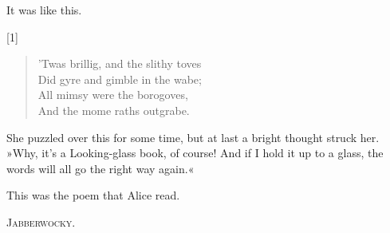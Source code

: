 It was like this.



	\begin{center}\scshape
	\end{center}

\scalebox{-1}[1]{%
\begin{minipage}{\linewidth}
	\raggedleft
	\begin{verse}
	\begin{altverse}
'Twas brillig, and the slithy toves\\
Did gyre and gimble in the wabe;\\
All mimsy were the borogoves,\\
And the mome raths outgrabe.
\end{altverse}
\end{verse}
\end{minipage}
}
\vspace{1em}




She puzzled over this for some time, but at last a bright thought struck her. »Why, it's a Looking-glass book, of course! And if I hold it up to a glass, the words will all go the right way again.«

This was the poem that Alice read.

\begin{center}\scshape
Jabberwocky.
\end{center}
\label{jabberwocky}

